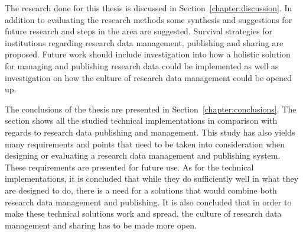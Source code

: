 The research done for this thesis is discussed in Section~\ref{chapter:discussion}. In addition to evaluating the research methods
some synthesis and suggestions for future research and steps in the area
are suggested. Survival strategies for institutions regarding research data
management, publishing and sharing are proposed. Future work should include investigation into how a
holistic solution for managing and publishing research data could be
implemented as well as investigation on how the culture of research data
management could be opened up.

The conclusions of the thesis are presented in Section~\ref{chapter:conclusions}. The section shows all the studied technical
implementations in comparison with regards to research data publishing
and management. This study has also yields many requirements and points
that need to be taken into consideration when designing or evaluating a
research data management and publishing system. These requirements are
presented for future use. As for the technical implementations, it is
concluded that while they do sufficiently well in what they are designed to
do, there is a need for a solutions that would combine both research data
management and publishing. It is also concluded that in order to make these
technical solutions work and spread, the culture of research data management and sharing
has to be made more open.

\iffalse
This is the introduction chapter - it will contain the following things.

\begin{itemize}
    \item general introduction to the subject
    \item general background
    \item objectives for the maste'r thesis
    \item the main research question - how to share research data?
    \begin{itemize}
        \item how to do it?
        \item how is it being done at the moment=
    \end{itemize}
    \item subproblems
    \begin{itemize}
        \item technical
        \item cultural
        \item organizational
    \end{itemize}
    \item what this thesis covers and what it does not cover
    \item positioning the work and how it's connected to other work
    \item important concepts
    \item the structure of the thesis
\end{itemize}
\fi

